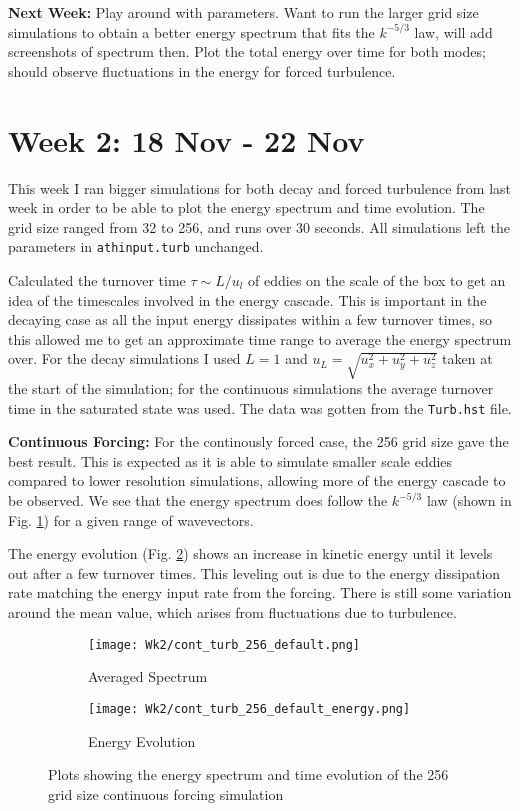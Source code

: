 \documentclass[12pt,letterpaper]{article}
\begin{document}
  \textbf{Next Week:} Play around with parameters. Want to run the larger grid size simulations to obtain a better energy spectrum that fits the $k^{-5/3}$ law, will add screenshots of spectrum then. Plot the total energy over time for both modes; should observe fluctuations in the energy for forced turbulence.


  \section*{Week 2: 18 Nov - 22 Nov}
  This week I ran bigger simulations for both decay and forced turbulence from last week in order to be able to plot the energy spectrum and time evolution. The grid size ranged from 32 to 256, and runs over 30 seconds. All simulations left the parameters in \verb|athinput.turb| unchanged.

  Calculated the turnover time $\tau \sim L/u_l$ of eddies on the scale of the box to get an idea of the timescales involved in the energy cascade. This is important in the decaying case as all the input energy dissipates within a few turnover times, so this allowed me to get an approximate time range to average the energy spectrum over. For the decay simulations I used $L=1$ and $u_L = \sqrt{u^2_x+u^2_y+u^2_z}$ taken at the start of the simulation; for the continuous simulations the average turnover time in the saturated state was used. The data was gotten from the \verb|Turb.hst| file.

  \textbf{Continuous Forcing:} For the continously forced case, the 256 grid size gave the best result. This is expected as it is able to simulate smaller scale eddies compared to lower resolution simulations, allowing more of the energy cascade to be observed. We see that the energy spectrum does follow the $k^{-5/3}$ law (shown in Fig. \ref{fig:256contspec}) for a given range of wavevectors.

  The energy evolution (Fig. \ref{fig:256conteng}) shows an increase in kinetic energy until it levels out after a few turnover times. This leveling out is due to the energy dissipation rate matching the energy input rate from the forcing. There is still some variation around the mean value, which arises from fluctuations due to turbulence.

  \begin{figure}[!h]
   \centering
  \begin{subfigure}{.4\linewidth}
    \centering
  \texttt{[image: Wk2/cont\_turb\_256\_default.png]}
  \caption{Averaged Spectrum}
  \label{fig:256contspec}
  \end{subfigure}
  \begin{subfigure}{.4\linewidth}
    \centering
  \texttt{[image: Wk2/cont\_turb\_256\_default\_energy.png]}
  \caption{Energy Evolution}
  \label{fig:256conteng}
  \end{subfigure}

  \caption{Plots showing the energy spectrum and time evolution of the 256 grid size continuous forcing simulation}
  \label{fig:256contenergy}
  \end{figure}
\end{document}
